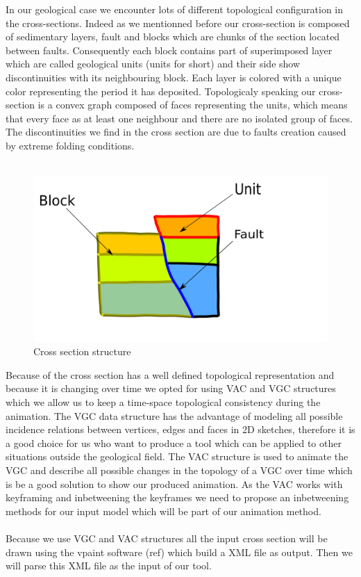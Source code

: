 \documentclass[12pt, a4paper]{memoir} %
\begin{document}
In our geological case we encounter lots of different topological configuration in the cross-sections. Indeed as we mentionned before our cross-section is composed of sedimentary layers, fault and blocks which are chunks of the section located between faults. Consequently each block contains part of superimposed layer which are called geological units (units for short) and their side show discontinuities with its neighbouring block. Each layer is colored with a unique color representing the period it has deposited. Topologicaly speaking our cross-section is a convex graph composed of faces representing the units, which means that every face as at least one neighbour and there are no isolated group of faces. The discontinuities we find in the cross section are due to faults creation caused by extreme folding conditions.\\\\

 \begin{figure}[H]
	\centering
	\includegraphics[scale=0.3]{geologyStructEdit.png}
	\caption{Cross section structure}
\end{figure}


Because of the cross section has a well defined topological representation and because it is changing over time we opted for using VAC and VGC structures which we allow us to keep a time-space topological consistency during the animation. The VGC data structure has the advantage of modeling all possible incidence relations between vertices, edges and faces in 2D sketches, therefore it is a good choice for us who want to produce a tool which can be applied to other situations outside the geological field. The VAC structure is used to animate the VGC and describe all possible changes in the topology of a VGC over time which is be a good solution to show our produced animation. As the VAC works with keyframing and inbetweening the keyframes we need to propose an inbetweening methods for our input model which will be part of our animation method.\\\\
  Because we use VGC and VAC structures all the input cross section will be drawn using the vpaint software (ref) which build a XML file as output. Then we will parse this XML file as the input of our tool.\\\\
\end{document}
